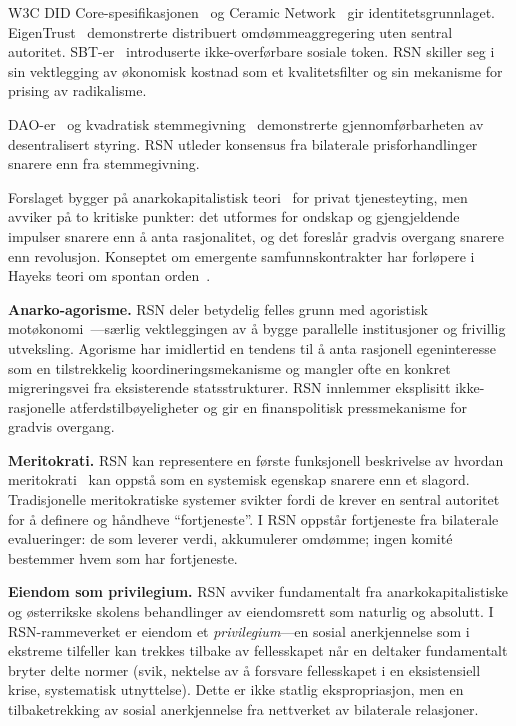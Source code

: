 \documentclass[11pt,a4paper,twocolumn]{article}
\begin{document}
W3C DID Core-spesifikasjonen~\cite{did2022} og Ceramic Network~\cite{ceramic2023} gir identitetsgrunnlaget. EigenTrust~\cite{kamvar2003} demonstrerte distribuert omdømmeaggregering uten sentral autoritet. SBT-er~\cite{weyl2022} introduserte ikke-overførbare sosiale token. RSN skiller seg i sin vektlegging av økonomisk kostnad som et kvalitetsfilter og sin mekanisme for prising av radikalisme.

DAO-er~\cite{buterin2014} og kvadratisk stemmegivning~\cite{buterin2019} demonstrerte gjennomførbarheten av desentralisert styring. RSN utleder konsensus fra bilaterale prisforhandlinger snarere enn fra stemmegivning.

Forslaget bygger på anarkokapitalistisk teori~\cite{rothbard1973,hoppe2001} for privat tjenesteyting, men avviker på to kritiske punkter: det utformes for ondskap og gjengjeldende impulser snarere enn å anta rasjonalitet, og det foreslår gradvis overgang snarere enn revolusjon. Konseptet om emergente samfunnskontrakter har forløpere i Hayeks teori om spontan orden~\cite{hayek1973}.

\textbf{Anarko-agorisme.} RSN deler betydelig felles grunn med agoristisk motøkonomi~\cite{konkin2006}---særlig vektleggingen av å bygge parallelle institusjoner og frivillig utveksling. Agorisme har imidlertid en tendens til å anta rasjonell egeninteresse som en tilstrekkelig koordineringsmekanisme og mangler ofte en konkret migreringsvei fra eksisterende statsstrukturer. RSN innlemmer eksplisitt ikke-rasjonelle atferdstilbøyeligheter og gir en finanspolitisk pressmekanisme for gradvis overgang.

\textbf{Meritokrati.} RSN kan representere en første funksjonell beskrivelse av hvordan meritokrati~\cite{young1958} kan oppstå som en systemisk egenskap snarere enn et slagord. Tradisjonelle meritokratiske systemer svikter fordi de krever en sentral autoritet for å definere og håndheve ``fortjeneste''. I RSN oppstår fortjeneste fra bilaterale evalueringer: de som leverer verdi, akkumulerer omdømme; ingen komité bestemmer hvem som har fortjeneste.

\textbf{Eiendom som privilegium.} RSN avviker fundamentalt fra anarkokapitalistiske og østerrikske skolens behandlinger av eiendomsrett som naturlig og absolutt. I RSN-rammeverket er eiendom et \emph{privilegium}---en sosial anerkjennelse som i ekstreme tilfeller kan trekkes tilbake av fellesskapet når en deltaker fundamentalt bryter delte normer (svik, nektelse av å forsvare fellesskapet i en eksistensiell krise, systematisk utnyttelse). Dette er ikke statlig ekspropriasjon, men en tilbaketrekking av sosial anerkjennelse fra nettverket av bilaterale relasjoner.
\end{document}
